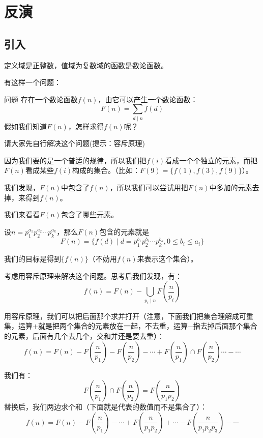 \documentclass[9pt]{beamer}
\begin{document}
		\section{反演}
			\subsection{引入}
			\begin{frame}
				\begin{definition}[数论函数]
					定义域是正整数，值域为复数域的函数是数论函数。
				\end{definition}
				有这样一个问题：
				\begin{block}{问题}
					存在一个数论函数$f(n)$，由它可以产生一个数论函数：
					$$
						F(n) = \sum_{d \mid n} f(d)
					$$
					假如我们知道$F(n)$，怎样求得$f(n)$呢？
				\end{block}
				请大家先自行解决这个问题(提示：容斥原理)
			\end{frame}
			\begin{frame}
				因为我们要的是一个普适的规律，所以我们把$f(i)$看成一个个独立的元素，而把$F(n)$看成某些$f(i)$构成的集合。（比如：$F(9) = \{f(1), f(3), f(9)\}$）。
				
				我们发现，$F(n)$中包含了$f(n)$，所以我们可以尝试用把$F(n)$中多加的元素去掉，来得到$f(n)$。
				
								\pause
				
				我们来看看$F(n)$包含了哪些元素。
				
				设$n = p_1^{a_1}p_2^{a_2}\cdots p_k^{a_k}$，那么$F(n)$包含的元素就是
				$$
				F(n) = \{f(d) \mid d = p_1^{b_1}p_2^{b_2}\cdots p_k^{b_k}, 0 \leq b_i \leq a_i\}
				$$
				
							\pause
				
				我们的目标是得到$\{f(n)\}$（不妨用$f(n)$来表示这个集合）。
				
			\end{frame}
			
			\begin{frame}
				
				考虑用容斥原理来解决这个问题。思考后我们发现，有：
				$$
					f(n) = F(n) - \bigcup_{p_i \mid n}F(\frac{n}{p_i})
				$$
				
							\pause
				
				用容斥原理，我们可以把后面那个求并打开（注意，下面我们把集合理解成可重集，运算$+$就是把两个集合的元素放在一起，不去重，运算$-$指去掉后面那个集合的元素，后面有几个去几个，交和并还是要去重）：
				$$
					f(n) = F(n) - F(\frac{n}{p_1}) - F(\frac{n}{p_2}) - \cdots + F(\frac{n}{p_1})\cap F(\frac{n}{p_2}) \cdots - \cdots
				$$
				
							\pause
				
				我们有：
				$$
					F(\frac{n}{p_1})\cap F(\frac{n}{p_2}) = F(\frac{n}{p_1p_2})
				$$
				替换后，我们两边求个和（下面就是代表的数值而不是集合了）：
				$$
					f(n) = F(n) - F(\frac{n}{p_1}) - \cdots + F(\frac{n}{p_1p_2}) + \cdots - F(\frac{n}{p_1p_2p_3}) - \cdots 
				$$
				
				
			\end{frame}
			
\end{document}
